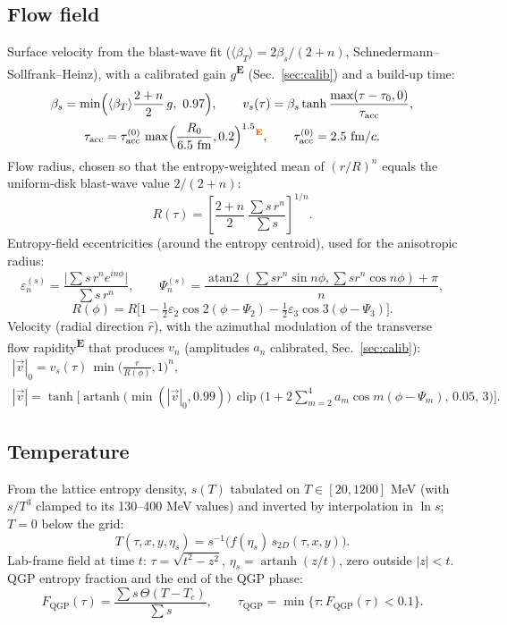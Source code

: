 \documentclass[11pt,a4paper]{article}
\newcommand{\emp}{\textsuperscript{\color{orange!80!black}\textbf{E}}}
\begin{document}
\subsection{Flow field}
Surface velocity from the blast-wave fit ($\langle\beta_T\rangle = 2\beta_s/(2+n)$, Schnedermann--Sollfrank--Heinz),
with a calibrated gain $g$\emp{} (Sec.~\ref{sec:calib}) and a build-up time:
\begin{gather}
\beta_s = \min\!\Big(\langle\beta_T\rangle\frac{2+n}{2}\,g,\ 0.97\Big),\qquad
v_s(\tau) = \beta_s\tanh\frac{\max(\tau-\tau_0,0)}{\tau_\text{acc}},\nonumber\\
\tau_\text{acc} = \tau^{(0)}_\text{acc}\,\max\!\Big(\frac{R_0}{6.5~\text{fm}},0.2\Big)^{1.5}\emp,\qquad \tau^{(0)}_\text{acc} = 2.5~\text{fm}/c .
\end{gather}
Flow radius, chosen so that the entropy-weighted mean of $(r/R)^n$ equals the uniform-disk blast-wave value $2/(2+n)$:
\begin{equation}
R(\tau) = \left[\frac{2+n}{2}\,\frac{\sum s\,r^n}{\sum s}\right]^{1/n}.
\end{equation}
Entropy-field eccentricities (around the entropy centroid), used for the anisotropic radius:
\begin{equation}
\varepsilon_n^{(s)} = \frac{\big|\sum s\,r^n e^{in\phi}\big|}{\sum s\,r^n},\qquad
\Psi_n^{(s)} = \frac{\operatorname{atan2}(\sum s r^n\sin n\phi,\sum s r^n\cos n\phi)+\pi}{n},
\end{equation}
\begin{equation}
R(\phi) = R\Big[1-\tfrac12\varepsilon_2\cos2(\phi-\Psi_2)-\tfrac12\varepsilon_3\cos3(\phi-\Psi_3)\Big].
\end{equation}
Velocity (radial direction $\hat r$), with the azimuthal modulation of the transverse flow rapidity\emp{} that produces
$v_n$ (amplitudes $a_n$ calibrated, Sec.~\ref{sec:calib}):
\begin{gather}
|\vec v|_0 = v_s(\tau)\,\min\!\Big(\frac{r}{R(\phi)},1\Big)^{n},\nonumber\\
|\vec v| = \tanh\!\Big[\operatorname{artanh}\big(\min(|\vec v|_0,0.99)\big)\,
\operatorname{clip}\Big(1+2\sum_{m=2}^4 a_m\cos m(\phi-\Psi_m),\,0.05,\,3\Big)\Big].
\end{gather}

\subsection{Temperature}
From the lattice entropy density, $s(T)$ tabulated on $T\in[20,1200]$ MeV (with $s/T^3$ clamped to its 130--400 MeV
values) and inverted by interpolation in $\ln s$; $T=0$ below the grid:
\begin{equation}
T(\tau,x,y,\eta_s) = s^{-1}\!\big(f(\eta_s)\,s_{2D}(\tau,x,y)\big).
\end{equation}
Lab-frame field at time $t$: $\tau=\sqrt{t^2-z^2}$, $\eta_s=\operatorname{artanh}(z/t)$, zero outside $|z|<t$.
QGP entropy fraction and the end of the QGP phase:
\begin{equation}
F_\text{QGP}(\tau) = \frac{\sum s\,\Theta(T-T_c)}{\sum s},\qquad \tau_\text{QGP} = \min\{\tau: F_\text{QGP}(\tau)<0.1\}.
\end{equation}
\end{document}
